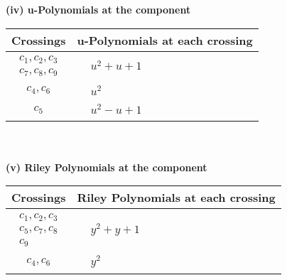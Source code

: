 \documentclass[1p]{elsarticle_modified}
\theoremstyle{definition}
\begin{document}
\newpage\renewcommand{\arraystretch}{1}
\flushleft \textbf{(iv) u-Polynomials at the component}\newline \\
\begin{tabular}{m{50pt}|m{274pt}}
Crossings & \hspace{64pt}u-Polynomials at each crossing \\
\hline $$\begin{aligned}c_{1},c_{2},c_{3}\\c_{7},c_{8},c_{9}\end{aligned}$$&$\begin{aligned}
&u^2+u+1
\end{aligned}$\\
\hline $$\begin{aligned}c_{4},c_{6}\end{aligned}$$&$\begin{aligned}
&u^2
\end{aligned}$\\
\hline $$\begin{aligned}c_{5}\end{aligned}$$&$\begin{aligned}
&u^2- u+1
\end{aligned}$\\
\hline
\end{tabular}\\~\\
\newpage\renewcommand{\arraystretch}{1}
\flushleft \textbf{(v) Riley Polynomials at the component}\newline \\
\begin{tabular}{m{50pt}|m{274pt}}
Crossings & \hspace{64pt}Riley Polynomials at each crossing \\
\hline $$\begin{aligned}c_{1},c_{2},c_{3}\\c_{5},c_{7},c_{8}\\c_{9}\end{aligned}$$&$\begin{aligned}
&y^2+y+1
\end{aligned}$\\
\hline $$\begin{aligned}c_{4},c_{6}\end{aligned}$$&$\begin{aligned}
&y^2
\end{aligned}$\\
\hline
\end{tabular}\\~\\
\end{document}
